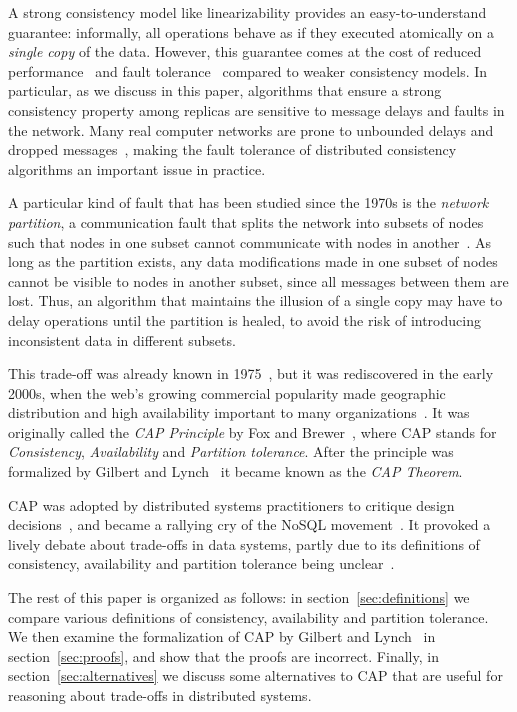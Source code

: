 \documentclass[a4paper,twocolumn,10pt]{article}
\begin{document}
A strong consistency model like linearizability provides an easy-to-understand guarantee:
informally, all operations behave as if they executed atomically on a \emph{single copy} of the
data. However, this guarantee comes at the cost of reduced performance~\cite{Attiya1994gw} and fault
tolerance~\cite{Davidson1985hv} compared to weaker consistency models. In particular, as we discuss
in this paper, algorithms that ensure a strong consistency property among replicas are sensitive to
message delays and faults in the network. Many real computer networks are prone to unbounded delays
and dropped messages~\cite{Bailis2014jx}, making the fault tolerance of distributed consistency
algorithms an important issue in practice.

A particular kind of fault that has been studied since the 1970s is the \emph{network partition}, a
communication fault that splits the network into subsets of nodes such that nodes in one subset
cannot communicate with nodes in another~\cite{Johnson1975we, Lindsay1979wv, Davidson1985hv}. As
long as the partition exists, any data modifications made in one subset of nodes cannot be visible
to nodes in another subset, since all messages between them are lost. Thus, an algorithm that
maintains the illusion of a single copy may have to delay operations until the partition is healed,
to avoid the risk of introducing inconsistent data in different subsets.

This trade-off was already known in 1975~\cite{Johnson1975we}, but it was rediscovered in the early
2000s, when the web's growing commercial popularity made geographic distribution and high
availability important to many organizations~\cite{Brewer2012tr, Vogels2008ey}. It was originally
called the \emph{CAP Principle} by Fox and Brewer~\cite{Fox1999bs, Brewer2000vd}, where CAP stands
for \emph{Consistency}, \emph{Availability} and \emph{Partition tolerance}. After the principle was
formalized by Gilbert and Lynch~\cite{Gilbert2002il, Gilbert2012bf} it became known as the
\emph{CAP Theorem}.

CAP was adopted by distributed systems practitioners to critique design
decisions~\cite{Hodges2013tj}, and became a rallying cry of the NoSQL movement~\cite{Brewer2012ba}.
It provoked a lively debate about trade-offs in data systems, partly due to its definitions of
consistency, availability and partition tolerance being unclear~\cite{Robinson2010tp}.

The rest of this paper is organized as follows: in section~\ref{sec:definitions} we compare various
definitions of consistency, availability and partition tolerance. We then examine the formalization
of CAP by Gilbert and Lynch~\cite{Gilbert2002il} in section~\ref{sec:proofs}, and show that the
proofs are incorrect. Finally, in section~\ref{sec:alternatives} we discuss some alternatives to CAP
that are useful for reasoning about trade-offs in distributed systems.
\end{document}
